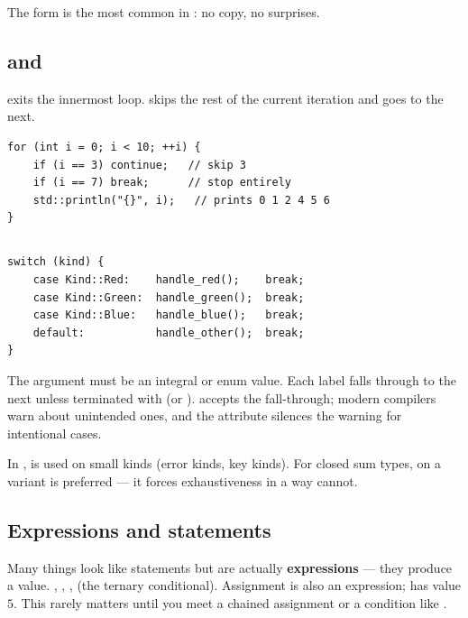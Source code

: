 The  form is the most common in \maya{}: no copy,
no surprises.

\subsection{ and }

 exits the innermost loop.  skips the
rest of the current iteration and goes to the next.

\begin{lstlisting}
for (int i = 0; i < 10; ++i) {
    if (i == 3) continue;   // skip 3
    if (i == 7) break;      // stop entirely
    std::println("{}", i);   // prints 0 1 2 4 5 6
}
\end{lstlisting}

\subsection{}

\begin{lstlisting}
switch (kind) {
    case Kind::Red:    handle_red();    break;
    case Kind::Green:  handle_green();  break;
    case Kind::Blue:   handle_blue();   break;
    default:           handle_other();  break;
}
\end{lstlisting}

The argument must be an integral or enum value. Each 
label falls through to the next unless terminated with 
(or ). \cpp{} accepts the fall-through; modern
compilers warn about unintended ones, and the attribute
\code{[[fallthrough]];} silences the warning for intentional cases.

In \maya{},  is used on small  kinds
(error kinds, key kinds). For closed sum types,  on
a variant is preferred --- it forces exhaustiveness in a way
 cannot.

\subsection{Expressions and statements}

Many things look like statements but are actually \textbf{expressions}
--- they produce a value. , , ,
 (the ternary conditional). Assignment is also an
expression;  has value $5$. This rarely matters until
you meet a chained assignment or a condition like .

